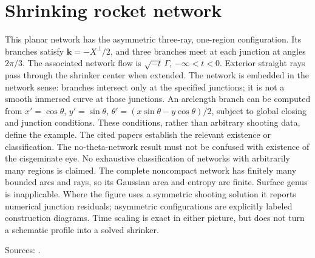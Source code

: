 \chapter{Shrinking rocket network}\label{sec:catalogue-network-rocket}
\begin{example}\label{ex:catalogue-network-rocket}
This planar network has the asymmetric three-ray, one-region configuration. Its branches satisfy $\mathbf k=-X^\perp/2$, and three branches meet at each junction at angles $2\pi/3$. The associated network flow is $\sqrt{-t}\,\Gamma$, $-\infty<t<0$. Exterior straight rays pass through the shrinker center when extended. The network is embedded in the network sense: branches intersect only at the specified junctions; it is not a smooth immersed curve at those junctions.
An arclength branch can be computed from $x'=\cos\theta$, $y'=\sin\theta$, $\theta'=(x\sin\theta-y\cos\theta)/2$, subject to global closing and junction conditions. These conditions, rather than arbitrary shooting data, define the example. The cited papers establish the relevant existence or classification. The no-theta-network result must not be confused with existence of the cisgeminate eye. No exhaustive classification of networks with arbitrarily many regions is claimed.
The complete noncompact network has finitely many bounded arcs and rays, so its Gaussian area and entropy are finite. Surface genus is inapplicable. Where the figure uses a symmetric shooting solution it reports numerical junction residuals; asymmetric configurations are explicitly labeled construction diagrams. Time scaling is exact in either picture, but does not turn a schematic profile into a solved shrinker.
\par Sources: \cite{CatChang2026,CatChenGuo2007}.
\end{example}

